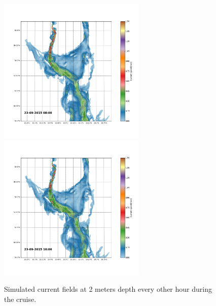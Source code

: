\documentclass[12pt,a4paper,english]{article}
\begin{document}
\begin{figure}[h]
{}
\centerline{
\includegraphics*[trim=2.0cm 3cm 6.0cm 3.5cm,clip=true,height=7cm]{Python/stromfelt_54}
\includegraphics*[trim=3.7cm 3cm 1.3cm 3.5cm,clip=true,height=7cm]{Python/stromfelt_56}
}
\caption{\small
Simulated current fields at 2 meters depth every other hour during the cruise.}
\label{fig:Current4}
\end{figure}




\clearpage
\pagebreak

%

\clearpage
\pagebreak
 
\end{document}
